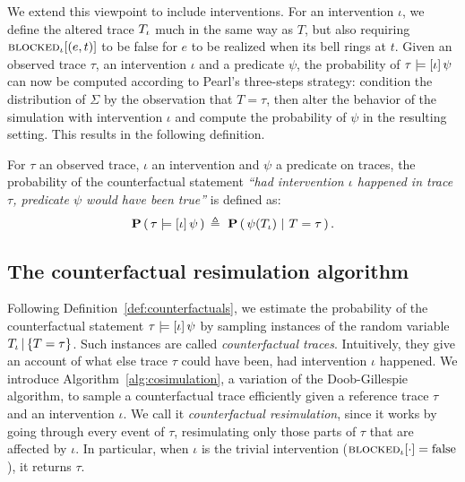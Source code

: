 We extend this viewpoint to include interventions. For an intervention $\iota$,
we define the altered trace ${T_\iota}{}$ much in the same way as $T$, but also
requiring ${\textsc{blocked}}_{\iota}[(e, t)]$ to be false for $e$ to be realized when its
bell rings at $t$.  Given an observed trace $\tau$, an intervention $\iota$ and
a predicate $\psi$, the probability of $\tau \models [\iota] \, \psi{}$ can now be computed according
to Pearl's three-steps strategy: \ItAbduction{} condition the distribution of
$\Sigma$ by the observation that $T=\tau$, then \ItAction{} alter the behavior
of the simulation with intervention $\iota$ and \ItPrediction{} compute the
probability of $\psi$ in the resulting setting. This results in the following
definition.

\begin{definition}\label{def:counterfactuals}
  For $\tau$ an observed trace, $\iota$ an intervention and $\psi$ a
  predicate on traces, the probability of the counterfactual statement
  \textit{``had intervention $\iota$ happened in trace $\tau$,
    predicate $\psi$ would have been true''} is defined as:
  \[ \PCFST{} \eqdef \ \ProbParen{\psi(\ATRAJ{}) \ |\ T = \tau}. \]
\end{definition}

\subsection{The counterfactual resimulation algorithm}
\label{subsec:cosim-algo}

Following Definition~\ref{def:counterfactuals}, we estimate the
probability of the counterfactual statement
$\tau \models [\iota] \, \psi{}$ by sampling instances of the random
variable ${T_\iota\,|\,\{T=\tau\}}{}$. Such instances are called \emph{counterfactual
  traces}. Intuitively, they give an account of what else trace $\tau$
could have been, had intervention $\iota$ happened.  We introduce
Algorithm~\ref{alg:cosimulation}, a variation of the Doob-Gillespie
algorithm, to sample a counterfactual trace efficiently given a
reference trace $\tau$ and an intervention $\iota$. We call it
\emph{counterfactual resimulation}, since it works by going
through every event of $\tau$, resimulating only those parts of $\tau$
that are affected by $\iota$. In particular, when $\iota$ is
the trivial intervention (${\textsc{blocked}}_{\iota}[\cdot] = \text{false}$), it
returns $\tau$.

